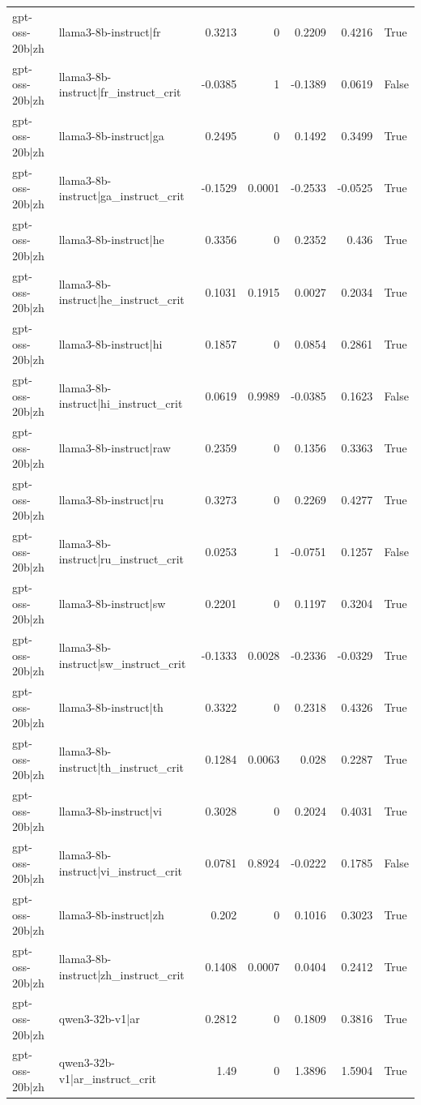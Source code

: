 \begin{table}
\begin{tabular}{l l r r r r l}
gpt-oss-20b|zh & llama3-8b-instruct|fr & 0.3213 & 0 & 0.2209 & 0.4216 & True \\
gpt-oss-20b|zh & llama3-8b-instruct|fr_instruct_crit & -0.0385 & 1 & -0.1389 & 0.0619 & False \\
gpt-oss-20b|zh & llama3-8b-instruct|ga & 0.2495 & 0 & 0.1492 & 0.3499 & True \\
gpt-oss-20b|zh & llama3-8b-instruct|ga_instruct_crit & -0.1529 & 0.0001 & -0.2533 & -0.0525 & True \\
gpt-oss-20b|zh & llama3-8b-instruct|he & 0.3356 & 0 & 0.2352 & 0.436 & True \\
gpt-oss-20b|zh & llama3-8b-instruct|he_instruct_crit & 0.1031 & 0.1915 & 0.0027 & 0.2034 & True \\
gpt-oss-20b|zh & llama3-8b-instruct|hi & 0.1857 & 0 & 0.0854 & 0.2861 & True \\
gpt-oss-20b|zh & llama3-8b-instruct|hi_instruct_crit & 0.0619 & 0.9989 & -0.0385 & 0.1623 & False \\
gpt-oss-20b|zh & llama3-8b-instruct|raw & 0.2359 & 0 & 0.1356 & 0.3363 & True \\
gpt-oss-20b|zh & llama3-8b-instruct|ru & 0.3273 & 0 & 0.2269 & 0.4277 & True \\
gpt-oss-20b|zh & llama3-8b-instruct|ru_instruct_crit & 0.0253 & 1 & -0.0751 & 0.1257 & False \\
gpt-oss-20b|zh & llama3-8b-instruct|sw & 0.2201 & 0 & 0.1197 & 0.3204 & True \\
gpt-oss-20b|zh & llama3-8b-instruct|sw_instruct_crit & -0.1333 & 0.0028 & -0.2336 & -0.0329 & True \\
gpt-oss-20b|zh & llama3-8b-instruct|th & 0.3322 & 0 & 0.2318 & 0.4326 & True \\
gpt-oss-20b|zh & llama3-8b-instruct|th_instruct_crit & 0.1284 & 0.0063 & 0.028 & 0.2287 & True \\
gpt-oss-20b|zh & llama3-8b-instruct|vi & 0.3028 & 0 & 0.2024 & 0.4031 & True \\
gpt-oss-20b|zh & llama3-8b-instruct|vi_instruct_crit & 0.0781 & 0.8924 & -0.0222 & 0.1785 & False \\
gpt-oss-20b|zh & llama3-8b-instruct|zh & 0.202 & 0 & 0.1016 & 0.3023 & True \\
gpt-oss-20b|zh & llama3-8b-instruct|zh_instruct_crit & 0.1408 & 0.0007 & 0.0404 & 0.2412 & True \\
gpt-oss-20b|zh & qwen3-32b-v1|ar & 0.2812 & 0 & 0.1809 & 0.3816 & True \\
gpt-oss-20b|zh & qwen3-32b-v1|ar_instruct_crit & 1.49 & 0 & 1.3896 & 1.5904 & True \\

\end{tabular}
\end{table}
